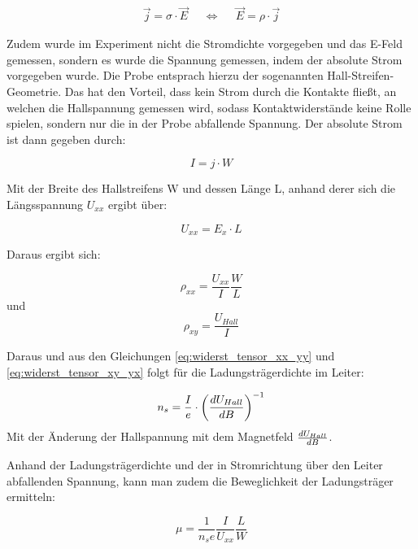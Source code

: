 \begin{align}
	\vec{j} = \sigma \cdot \vec{E} & & \Leftrightarrow & & \vec{E} = \rho \cdot \vec{j}
	\label{eq:u2rho}
\end{align}

Zudem wurde im Experiment nicht die Stromdichte vorgegeben und das E-Feld gemessen, sondern es wurde die Spannung gemessen, indem der absolute Strom vorgegeben wurde. Die Probe entsprach hierzu der sogenannten Hall-Streifen-Geometrie. 
Das hat den Vorteil, dass kein Strom durch die Kontakte fließt, an welchen die Hallspannung gemessen wird, sodass Kontaktwiderstände keine Rolle spielen, sondern nur die in der Probe abfallende Spannung. Der absolute Strom ist dann gegeben durch:

\begin{equation}
I=j \cdot W
\label{eq:absoluter_Strom}
\end{equation}

Mit der Breite des Hallstreifens W und dessen Länge L, anhand derer sich die Längsspannung $U_{xx}$ ergibt über:

\begin{equation}
U_{xx}=E_x \cdot L
\label{eq:laengsspannung}
\end{equation}

Daraus ergibt sich:

\begin{equation}
\rho_{xx}=\frac{U_{xx}}{I}\frac{W}{L}
\label{eq:rho_xx}
\end{equation}
und
\begin{equation}
\rho_{xy}=\frac{U_{Hall}}{I}
\label{eq:rho_xy}
\end{equation}

Daraus und aus den Gleichungen \ref{eq:widerst_tensor_xx_yy} und \ref{eq:widerst_tensor_xy_yx} folgt für die Ladungsträgerdichte im Leiter:
 
 \begin{equation}
 n_s=\frac{I}{e} \cdot \left( \frac{d U_{Hall}}{d B} \right)^{-1}
 \label{eq:ladungsdichte_steig}
 \end{equation}
 Mit der Änderung der Hallspannung mit dem Magnetfeld $\frac{d U_{Hall}}{d B}$. 
 
 Anhand der Ladungsträgerdichte und der in Stromrichtung über den Leiter abfallenden Spannung, kann man zudem die Beweglichkeit der Ladungsträger ermitteln:
 
 \begin{equation}
 \mu=\frac{1}{n_se}\frac{I}{U_{xx}}\frac{L}{W}
 \label{eq:bewegl_masse}
 \end{equation}


